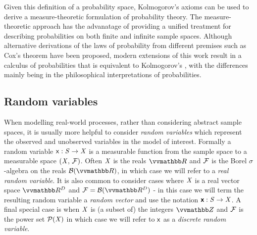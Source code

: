Given this definition of a probability space, Kolmogorov's axioms \citep{} can be used to derive a measure-theoretic formulation of probability theory. The measure-theoretic approach has the advanatage of providing a unified treatment for describing probabilities on both finite and infinite sample spaces. Although alternative derivations of the laws of probability from different premises such as Cox's theorem \citep{} have been proposed, modern extensions of this work result in a calculus of probabilities that is equivalent to Kolmogorov's \citep{}, with the differences mainly being in the philosophical interpretations of probabilities.

\subsection{Random variables}

When modelling real-world processes, rather than considering abstract sample spaces, it is usually more helpful to consider \emph{random variables} which represent the observed and unobserved variables in the model of interest. Formally a random variable $\mathsf{x} : \mathit{S} \to \mathit{X}$ is a measurable function from the sample space to a measurable space $(\mathit{X},\,\mathcal{F})$. Often $\mathit{X}$ is the reals $\reals$ and $\mathcal{F}$ is the Borel $\sigma$-algebra on the reals $\sset{B}(\reals)$, in which case we will refer to a \emph{real random variable}. It is also common to consider cases where $\mathit{X}$ is a real vector space $\reals^D$ and $\sset{F} = \sset{B}(\reals^D)$ - in this case we will term the resulting random variable a \emph{random vector} and use the notation $\boldsymbol{\mathsf{x}} : \mathit{S} \to \mathit{X}$. A final special case is when $\mathit{X}$ is (a subset of) the integers $\integers$ and $\mathcal{F}$ is the power set $\mathcal{P}(\mathit{X})$ in which case we will refer to $\mathsf{x}$ as a \emph{discrete random variable}.

